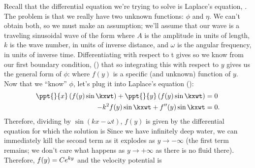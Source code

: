 \documentclass[12pt]{book}
\begin{document}
Recall that the differential equation  we're trying to solve is Laplace's equation, .  The problem is that we really have two unknown functions: $\phi$ and $\eta$.  We can't obtain both, so we must make an assumption; we'll assume that our  wave is a traveling sinusoidal wave of the form
where $A$ is the amplitude in units of length, $k$ is the wave number, in units of inverse distance, and $\omega$ is the angular frequency, in units of inverse time.  Differentiating  with respect to t gives
 so we know from our first boundary condition, () that
 so integrating this with respect to $y$ gives us the general form of $\phi$:
where $f(y)$ is a specific (and unknown) function of $y$.  Now that we ``know'' $\phi$, let's plug it into Laplace's equation ():
\begin{align*}
\ppt{}{x}\left(   f(y)\sin\kxwt \right)  + \ppt{}{y}\left( f(y)\sin\kxwt\right)&=0\\
-k^2f(y)\sin\kxwt + f''(y)\sin\kxwt &= 0.
\end{align*}
Therefore, dividing by $\sin(kx-\omega t)$, $f(y)$ is given by the differential equation
for which the solution is
Since we have infinitely deep water, we can immediately kill the second term as it explodes as \mbox{$y\to-\infty$} (the first term remains; we don't care what happens as $y\to+\infty$ as there is no fluid there). Therefore, $f(y)=Ce^{ky}$ and the velocity potential is
\end{document}
